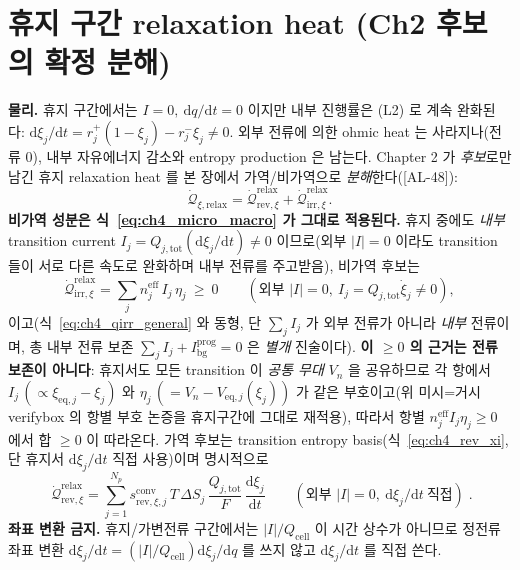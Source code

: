 \documentclass[11pt,a4paper]{article}
\newcommand{\dd}{\mathrm{d}}
\newcommand{\eff}{\mathrm{eff}}
\newcommand{\eq}{\mathrm{eq}}
\newcommand{\bg}{\mathrm{bg}}
\newcommand{\cell}{\mathrm{cell}}
\newcommand{\tot}{\mathrm{tot}}
\newcommand{\irr}{\mathrm{irr}}
\newcommand{\rev}{\mathrm{rev}}
\newcommand{\rlx}{\mathrm{relax}}
\newcommand{\conv}{\mathrm{conv}}
\newcommand{\prog}{\mathrm{prog}}
\newcommand{\AL}[1]{\textsf{[AL-#1]}}
\begin{document}
\section{휴지 구간 relaxation heat (Ch2 후보의 확정 분해)}\label{sec:ch4_rest}
\textbf{물리.} 휴지 구간에서는 $I=0,\ \dd q/\dd t=0$ 이지만 내부 진행률은 (L2) 로 계속 완화된다:
$\dd\xi_j/\dd t=r_j^+(1-\xi_j)-r_j^-\xi_j\ne0$. 외부 전류에 의한 ohmic heat 는 사라지나(전류 $0$), 내부
자유에너지 감소와 entropy production 은 남는다. Chapter 2 가 \emph{후보}로만 남긴 휴지 relaxation heat 를
본 장에서 가역/비가역으로 \emph{분해}한다(\AL{48}):
\begin{equation}
\dot{\mathcal Q}_{\xi,\rlx}=\dot{\mathcal Q}_{\rev,\xi}^{\rlx}+\dot{\mathcal Q}_{\irr,\xi}^{\rlx}.
\label{eq:ch4_rest_split}
\end{equation}
\textbf{비가역 성분은 식~\eqref{eq:ch4_micro_macro} 가 그대로 적용된다.} 휴지 중에도 \emph{내부} transition
current $I_j=Q_{j,\tot}(\dd\xi_j/\dd t)\ne0$ 이므로(외부 $|I|=0$ 이라도 transition 들이 서로 다른 속도로
완화하며 내부 전류를 주고받음), 비가역 후보는
\begin{equation}
\dot{\mathcal Q}_{\irr,\xi}^{\rlx}=\sum_j n_j^{\eff}\,I_j\,\eta_j\ \ge\ 0\qquad(\text{외부 }|I|=0,\ I_j=Q_{j,\tot}\dot\xi_j\ne0),
\label{eq:ch4_rest_irr}
\end{equation}
이고(식~\eqref{eq:ch4_qirr_general} 와 동형, 단 $\sum_j I_j$ 가 외부 전류가 아니라 \emph{내부} 전류이며, 총 내부
전류 보존 $\sum_j I_j+I_\bg^{\prog}=0$ 은 \emph{별개} 진술이다). \textbf{이 $\ge0$ 의 근거는 전류 보존이 아니다}:
휴지서도 모든 transition 이 \emph{공통 무대} $V_n$ 을 공유하므로 각 항에서 $I_j\,(\propto\xi_{\eq,j}-\xi_j)$ 와
$\eta_j\,(=V_n-V_{\eq,j}(\xi_j))$ 가 같은 부호이고(위 미시=거시 verifybox 의 항별 부호 논증을 휴지구간에 그대로
재적용), 따라서 항별 $n_j^{\eff}I_j\eta_j\ge0$ 에서 합 $\ge0$ 이 따라온다. 가역 후보는 transition entropy
basis(식~\eqref{eq:ch4_rev_xi}, 단 휴지서 $\dd\xi_j/\dd t$ 직접 사용)이며 명시적으로
\begin{equation}
\boxed{\;\dot{\mathcal Q}_{\rev,\xi}^{\rlx}=\sum_{j=1}^{N_p}s_{\rev,\xi,j}^{\conv}\,T\,\Delta S_j\,\frac{Q_{j,\tot}}{F}\,\frac{\dd\xi_j}{\dd t}\qquad(\text{외부 }|I|=0,\ \dd\xi_j/\dd t\ \text{직접})\;.}
\label{eq:ch4_rest_rev}
\end{equation}
\textbf{좌표 변환 금지.} 휴지/가변전류 구간에서는 $|I|/Q_\cell$ 이 시간 상수가
아니므로 정전류 좌표 변환 $\dd\xi_j/\dd t=(|I|/Q_\cell)\dd\xi_j/\dd q$ 를 쓰지 않고 $\dd\xi_j/\dd t$ 를 직접 쓴다.
\end{document}
